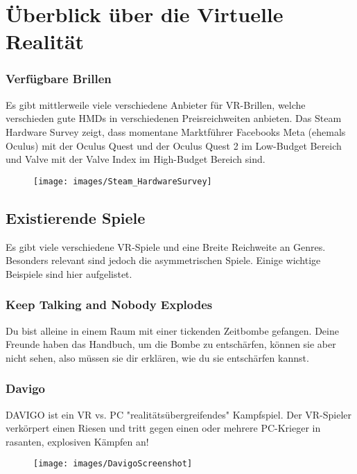 \chapter{Überblick über die Virtuelle Realität}


\subsection{Verfügbare Brillen}
Es gibt mittlerweile viele verschiedene Anbieter für VR-Brillen, welche verschieden gute HMDs in verschiedenen Preisreichweiten anbieten.
Das Steam Hardware Survey zeigt, dass momentane Marktführer Facebooks Meta (ehemals Oculus) mit der Oculus Quest und der Oculus Quest 2 im Low-Budget Bereich und Valve mit der Valve Index im High-Budget Bereich sind.


\begin{figure}[h]
	\centering
	\texttt{[image: images/Steam\_HardwareSurvey]}
	\caption{\cite{_steam_hardware}}
\end{figure}

\section{Existierende Spiele}
Es gibt viele verschiedene VR-Spiele und eine Breite Reichweite an Genres. Besonders relevant sind jedoch die asymmetrischen Spiele. Einige wichtige Beispiele sind hier aufgelistet.

\subsection{Keep Talking and Nobody Explodes}
Du bist alleine in einem Raum mit einer tickenden Zeitbombe gefangen. Deine Freunde haben das Handbuch, um die Bombe zu entschärfen, können sie aber nicht sehen, also müssen sie dir erklären, wie du sie entschärfen kannst.

\subsection{Davigo}
DAVIGO ist ein VR vs. PC "realitätsübergreifendes" Kampfspiel. Der VR-Spieler verkörpert einen Riesen und tritt gegen einen oder mehrere PC-Krieger in rasanten, explosiven Kämpfen an!

\begin{figure}[h]
	\centering
	\texttt{[image: images/DavigoScreenshot]}
	\caption{\cite{_steam_davigo}}
\end{figure}

